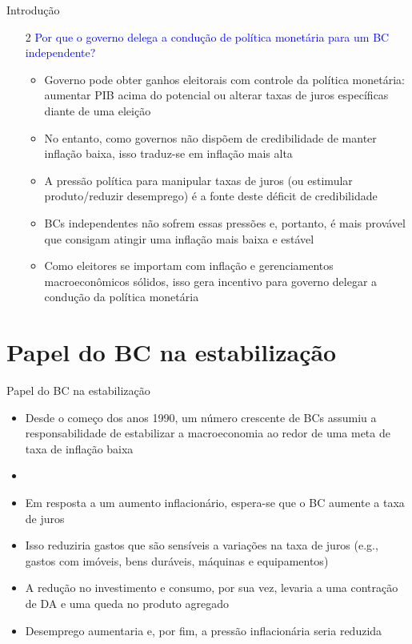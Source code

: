 \documentclass[10pt]{beamer}
\begin{document}
\begin{frame}
    {Introdução}
    \begin{enumerate}
        \item[2] \textcolor{blue}{Por que o governo delega a condução de política monetária para um BC independente?}\medskip
        \begin{itemize}
            \item Governo pode obter ganhos eleitorais com controle da política monetária: aumentar PIB acima do potencial ou alterar taxas de juros específicas diante de uma eleição\medskip
            \item No entanto, como governos não dispõem de credibilidade de manter inflação baixa, isso traduz-se em inflação mais alta\medskip
            \item A pressão política para manipular taxas de juros (ou estimular produto/reduzir desemprego) é a fonte deste déficit de credibilidade\medskip
            \item BCs independentes não sofrem essas pressões e, portanto, é mais provável que consigam atingir uma inflação mais baixa e estável\medskip
            \item Como eleitores se importam com inflação e gerenciamentos macroeconômicos sólidos, isso gera incentivo para governo delegar a condução da política monetária
        \end{itemize} 
    \end{enumerate}
\end{frame}

\section{Papel do BC na estabilização}
\begin{frame}
    {Papel do BC na estabilização}
    \begin{itemize}
        \item Desde o começo dos anos 1990, um número crescente de BCs assumiu a responsabilidade de estabilizar a macroeconomia ao redor de uma meta de taxa de inflação baixa\bigskip
        \item {}\bigskip
        \item Em resposta a um aumento inflacionário, espera-se que o BC aumente a taxa de juros\bigskip
        \item Isso reduziria gastos que são sensíveis a variações na taxa de juros (e.g., gastos com imóveis, bens duráveis, máquinas e equipamentos)\bigskip
        \item A redução no investimento e consumo, por sua vez, levaria a uma contração de DA e uma queda no produto agregado\bigskip
        \item Desemprego aumentaria e, por fim, a pressão inflacionária seria reduzida
    \end{itemize}
\end{frame}
\end{document}
